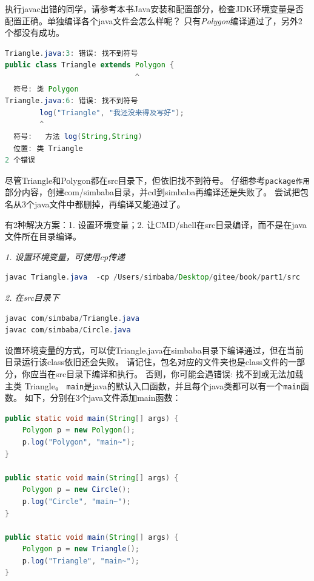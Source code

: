 \noindent
执行javac出错的同学，请参考本书Java安装和配置部分，检查JDK环境变量是否配置正确。单独编译各个java文件会怎么样呢？
只有\emph{Polygon}编译通过了，另外2个都没有成功。

\begin{lstlisting}[language=Java,mathescape]
Triangle.java:3: 错误: 找不到符号
public class Triangle extends Polygon {
                              ^
  符号: 类 Polygon
Triangle.java:6: 错误: 找不到符号
        log("Triangle", "我还没来得及写好");
        ^
  符号:   方法 log(String,String)
  位置: 类 Triangle
2 个错误
\end{lstlisting}

\noindent
尽管Triangle和Polygon都在src目录下，但依旧找不到符号。
仔细参考\lstinline{package作用}部分内容，创建com/simbaba目录，并cd到simbaba再编译还是失败了。
尝试把包名从3个java文件中都删掉，再编译又能通过了。

\vspace{0.3cm}
有2种解决方案：1. 设置环境变量；2. 让CMD/shell在src目录编译，而不是在java文件所在目录编译。
\vspace{0.3cm} 

\noindent \emph{1. 设置环境变量，可使用cp传递}
\begin{lstlisting}[language=Java,mathescape]
javac Triangle.java  -cp /Users/simbaba/Desktop/gitee/book/part1/src
\end{lstlisting}

\noindent \emph{2. 在src目录下}
\begin{lstlisting}[language=Java,mathescape]
javac com/simbaba/Triangle.java
javac com/simbaba/Circle.java
\end{lstlisting}

设置环境变量的方式，可以使Triangle.java在simbaba目录下编译通过，但在当前目录运行该class依旧还会失败。
请记住，包名对应的文件夹也是class文件的一部分，你应当在src目录下编译和执行。
否则，你可能会遇错误: 找不到或无法加载主类 Triangle。
\lstinline{main}是java的默认入口函数，并且每个java类都可以有一个\lstinline{main}函数。
如下，分别在3个java文件添加main函数：

\begin{lstlisting}[language=Java,mathescape]
public static void main(String[] args) {
    Polygon p = new Polygon();
    p.log("Polygon", "main~");
}

public static void main(String[] args) {
    Polygon p = new Circle();
    p.log("Circle", "main~");
}

public static void main(String[] args) {
    Polygon p = new Triangle();
    p.log("Triangle", "main~");
}
\end{lstlisting}


